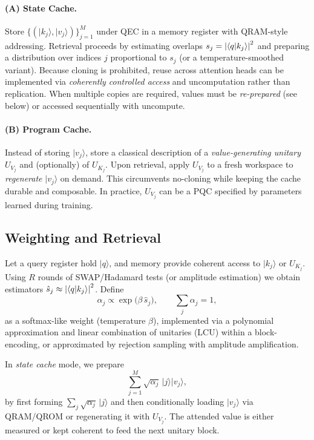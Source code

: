 \documentclass[11pt]{article}
\newcommand{\qket}[1]{\lvert #1 \rangle}
\newcommand{\qip}[2]{\langle #1 \vert #2 \rangle}
\begin{document}
\paragraph{(A) State Cache.}
Store $\{(\qket{k_j},\qket{v_j})\}_{j=1}^M$ under QEC in a memory register with QRAM-style addressing.
Retrieval proceeds by estimating overlaps $s_j = \abs{\qip{q}{k_j}}^2$ and preparing a distribution over indices $j$ proportional to $s_j$ (or a temperature-smoothed variant).
Because cloning is prohibited, reuse across attention heads can be implemented via \emph{coherently controlled access} and uncomputation rather than replication.
When multiple copies are required, values must be \emph{re-prepared} (see below) or accessed sequentially with uncompute.

\paragraph{(B) Program Cache.}
Instead of storing $\qket{v_j}$, store a classical description of a \emph{value-generating unitary} $U_{V_j}$ and (optionally) of $U_{K_j}$.
Upon retrieval, apply $U_{V_j}$ to a fresh workspace to \emph{regenerate} $\qket{v_j}$ on demand.
This circumvents no-cloning while keeping the cache durable and composable.
In practice, $U_{V_j}$ can be a PQC specified by parameters learned during training.

\subsection{Weighting and Retrieval}
Let a query register hold $\qket{q}$, and memory provide coherent access to $\qket{k_j}$ or $U_{K_j}$.
Using $R$ rounds of SWAP/Hadamard tests (or amplitude estimation) we obtain estimators $\hat{s}_j\approx \abs{\qip{q}{k_j}}^2$.
Define
\begin{equation}
    \alpha_j \propto \exp\!\Big(\beta\, \hat{s}_j\Big), \qquad 
    \sum_j \alpha_j = 1,
\end{equation}
as a softmax-like weight (temperature $\beta$), implemented via a polynomial approximation and linear combination of unitaries (LCU) within a block-encoding, or approximated by rejection sampling with amplitude amplification.

In \emph{state cache} mode, we prepare
\begin{equation}
    \sum_{j=1}^M \sqrt{\alpha_j}\,\qket{j}\qket{v_j},
\end{equation}
by first forming $\sum_j \sqrt{\alpha_j}\,\qket{j}$ and then conditionally loading $\qket{v_j}$ via QRAM/QROM or regenerating it with $U_{V_j}$.
The attended value is either measured or kept coherent to feed the next unitary block.
\end{document}
